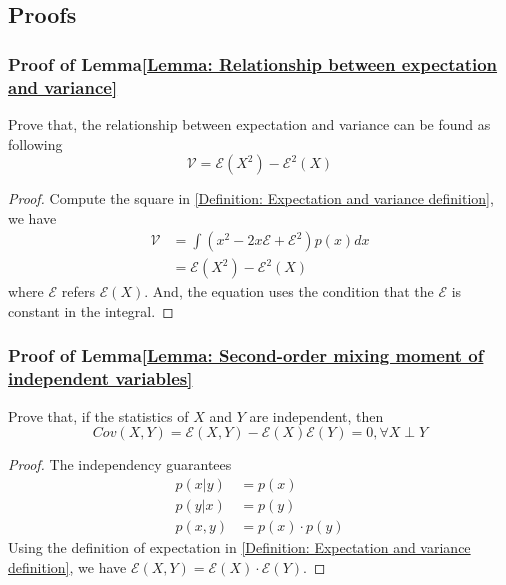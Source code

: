 \documentclass[../main.tex]{subfiles}
\begin{document}
\begin{subappendices}

    \subsection{Proofs}

    \subsubsection{Proof of Lemma\ref{Lemma: Relationship between expectation and variance}}
    Prove that, the relationship between expectation and variance can be found as following
    \begin{equation*}
        \mathcal{V} = \mathcal{E}(X^2) - \mathcal{E}^2(X)
    \end{equation*}

    \begin{proof}
        Compute the square in \eqref{Definition: Expectation and variance definition},
        we have
        \begin{align*}
            \mathcal{V} & = \int (x^2 - 2 x \mathcal{E} + \mathcal{E}^2) p(x) dx \\
                        & = \mathcal{E}(X^2) - \mathcal{E}^2(X)
        \end{align*}
        where $\mathcal{E}$ refers $\mathcal{E}(X)$.
        And, the equation uses the condition that the $\mathcal{E}$ is constant in the integral.
    \end{proof}

    \subsubsection{Proof of Lemma\ref{Lemma: Second-order mixing moment of independent variables}}
    Prove that, if the statistics of $X$ and $Y$ are independent, then
    \begin{equation*}
        Cov(X, Y) =
        \mathcal{E}(X, Y) - \mathcal{E}(X) \mathcal{E}(Y) = 0,
        \forall X \perp Y
    \end{equation*}

    \begin{proof}
        The independency guarantees
        \begin{align*}
            p(x|y)  & = p(x)            \\
            p(y|x)  & = p(y)            \\
            p(x, y) & = p(x) \cdot p(y)
        \end{align*}
        Using the definition of expectation in \eqref{Definition: Expectation and variance definition},
        we have $\mathcal{E}(X, Y) = \mathcal{E}(X) \cdot \mathcal{E}(Y)$.
    \end{proof}


\end{subappendices}
\end{document}
